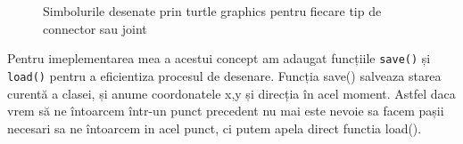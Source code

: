\begin{figure}[H]
    \centering
    \qquad
    \caption{Simbolurile desenate prin turtle graphics pentru fiecare tip de connector sau joint}%
    \label{fig:example}%
\end{figure}


Pentru imeplementarea mea a acestui concept am adaugat funcțiile \verb|save()| și \verb|load()| pentru a eficientiza procesul de desenare.
Funcția save() salveaza starea curentă a clasei, și anume coordonatele x,y și direcția în acel moment. Astfel daca vrem să ne întoarcem 
într-un punct precedent nu mai este nevoie sa facem pașii necesari sa ne întoarcem in acel punct, ci putem apela direct functia load().\newline

